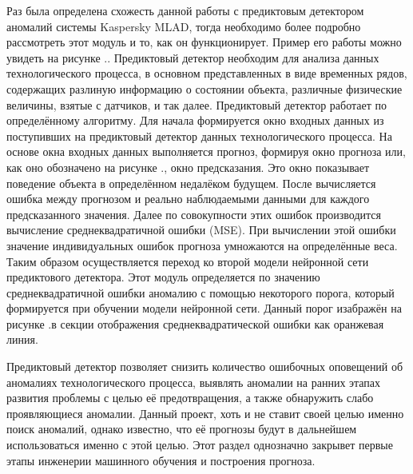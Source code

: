{  \par \redline Раз была определена схожесть данной работы с предиктовым детектором аномалий системы Kaspersky MLAD, тогда необходимо более подробно рассмотреть этот модуль и то, как он функционирует. Пример его работы можно увидеть на рисунке \thechaptercntr .\theimagecntr. Предиктовый детектор необходим для анализа данных технологического процесса, в основном представленных в виде временных рядов, содержащих разлиную информацию о состоянии объекта, различные физические величины, взятые с датчиков, и так далее. Предиктовый детектор работает по определённому алгоритму. Для начала формируется окно входных данных из поступивших на предиктовый детектор данных технологического процесса. На основе окна входных данных выполняется прогноз, формируя окно прогноза или, как оно обозначено на рисунке \thechaptercntr .\theimagecntr, окно предсказания. Это окно показывает поведение объекта в определённом недалёком будущем. После вычисляется ошибка между прогнозом и реально наблюдаемыми данными для каждого предсказанного значения. Далее по совокупности этих ошибок производится вычисление среднеквадратичной ошибки (MSE). При вычислении этой ошибки значение индивидуальных ошибок прогноза умножаются на определённые веса. Таким образом осуществляется переход ко второй модели нейронной сети предиктового детектора. Этот модуль определяется по значению среднеквадратичной ошибки аномалию с помощью некоторого порога, который формируется при обучении модели нейронной сети. Данный порог изабражён на рисунке \thechaptercntr .\theimagecntr \spc в секции отображения среднеквадратической ошибки как оранжевая линия. \addtocounter{imagecntr}{1}

  \par \redline Предиктовый детектор позволяет снизить количество ошибочных оповещений об аномалиях технологического процесса, выявлять аномалии на ранних этапах развития проблемы с целью её предотвращения, а также обнаружить слабо проявляющиеся аномалии. Данный проект, хоть и не ставит своей целью именно поиск аномалий, однако известно, что её прогнозы будут в дальнейшем использоваться именно с этой целью. Этот раздел однозначно закрывет первые этапы инженерии машинного обучения и построения прогноза.

  \par
}

\setcounter{subchaptercntr}{1}
\setcounter{imagecntr}{1}
